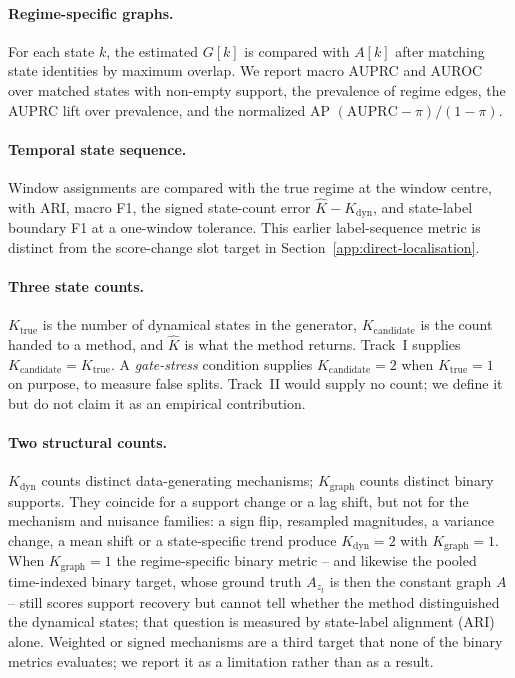 \documentclass[11pt]{article}
\newcommand{\kdyn}{K_{\mathrm{dyn}}}
\newcommand{\kgraph}{K_{\mathrm{graph}}}
\begin{document}
\paragraph{Regime-specific graphs.} For each state $k$, the estimated $G[k]$ is
compared with $A[k]$ after matching state identities by maximum overlap. We
report macro AUPRC and AUROC over matched states with non-empty support, the
prevalence of regime edges, the AUPRC lift over prevalence, and the normalized
AP $(\mathrm{AUPRC}-\pi)/(1-\pi)$.

\paragraph{Temporal state sequence.} Window assignments are compared with the
true regime at the window centre, with ARI, macro F1, the signed state-count
error $\hat K-\kdyn$, and state-label boundary F1 at a one-window tolerance.
This earlier label-sequence metric is distinct from the score-change slot
target in Section~\ref{app:direct-localisation}.

\paragraph{Three state counts.} $K_{\mathrm{true}}$ is the number of dynamical
states in the generator, $K_{\mathrm{candidate}}$ is the count handed to a
method, and $\hat K$ is what the method returns. Track~I supplies
$K_{\mathrm{candidate}}=K_{\mathrm{true}}$. A \emph{gate-stress} condition
supplies $K_{\mathrm{candidate}}=2$ when $K_{\mathrm{true}}=1$ on purpose, to
measure false splits. Track~II would supply no count; we define it but do not
claim it as an empirical contribution.

\paragraph{Two structural counts.}
$\kdyn$ counts distinct data-generating mechanisms; $\kgraph$ counts distinct
binary supports. They coincide for a support change or a lag shift, but not for
the mechanism and nuisance families: a sign flip, resampled magnitudes, a
variance change, a mean shift or a state-specific trend produce $\kdyn=2$ with
$\kgraph=1$. When $\kgraph=1$ the regime-specific binary metric -- and likewise
the pooled time-indexed binary target, whose ground truth $A_{z_t}$ is then the
constant graph $A$ -- still scores support recovery but cannot tell whether the
method distinguished the dynamical states; that question is measured by
state-label alignment (ARI) alone. Weighted or signed mechanisms are a third
target that none of the binary metrics evaluates; we report it as a limitation
rather than as a result.
\end{document}

